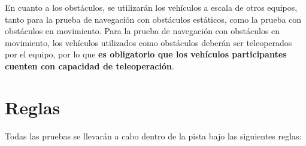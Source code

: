 \documentclass[letterpaper,12pt]{article}
\begin{document}
En cuanto a los obstáculos, se utilizarán los vehículos a escala de otros equipos, tanto para la prueba de navegación con obstáculos estáticos, como la prueba con obstáculos en movimiento. Para la prueba de navegación con obstáculos en movimiento, los vehículos utilizados como obstáculos deberán ser teleoperados por el equipo, por lo que \textbf{es obligatorio que los vehículos participantes cuenten con capacidad de teleoperación}. 

\section{Reglas}

Todas las pruebas se llevarán a cabo dentro de la pista bajo las siguientes reglas:
\end{document}
